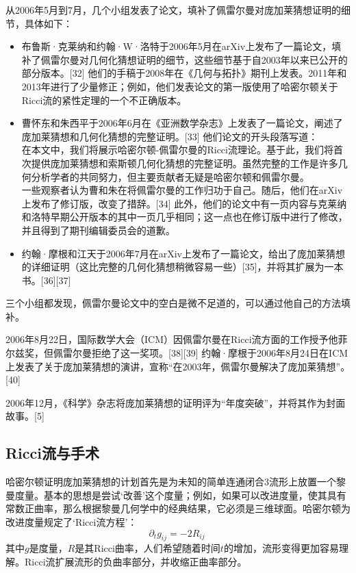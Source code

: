 从2006年5月到7月，几个小组发表了论文，填补了佩雷尔曼对庞加莱猜想证明的细节，具体如下：
\begin{itemize}
\item 布鲁斯·克莱纳和约翰·W·洛特于2006年5月在arXiv上发布了一篇论文，填补了佩雷尔曼对几何化猜想证明的细节，这些细节基于自2003年以来已公开的部分版本。[32] 他们的手稿于2008年在《几何与拓扑》期刊上发表。2011年和2013年进行了少量修正；例如，他们发表论文的第一版使用了哈密尔顿关于Ricci流的紧性定理的一个不正确版本。
\item 曹怀东和朱西平于2006年6月在《亚洲数学杂志》上发表了一篇论文，阐述了庞加莱猜想和几何化猜想的完整证明。[33] 他们论文的开头段落写道：\\
在本文中，我们将展示哈密尔顿-佩雷尔曼的Ricci流理论。基于此，我们将首次提供庞加莱猜想和索斯顿几何化猜想的完整证明。虽然完整的工作是许多几何分析学者的共同努力，但主要贡献者无疑是哈密尔顿和佩雷尔曼。\\
一些观察者认为曹和朱在将佩雷尔曼的工作归功于自己。随后，他们在arXiv上发布了修订版，改变了措辞。[34] 此外，他们的论文中有一页内容与克莱纳和洛特早期公开版本的其中一页几乎相同；这一点也在修订版中进行了修改，并且得到了期刊编辑委员会的道歉。\\
\item 约翰·摩根和江天于2006年7月在arXiv上发布了一篇论文，给出了庞加莱猜想的详细证明（这比完整的几何化猜想稍微容易一些）[35]，并将其扩展为一本书。[36][37]
\end{itemize}
三个小组都发现，佩雷尔曼论文中的空白是微不足道的，可以通过他自己的方法填补。

2006年8月22日，国际数学大会（ICM）因佩雷尔曼在Ricci流方面的工作授予他菲尔兹奖，但佩雷尔曼拒绝了这一奖项。[38][39] 约翰·摩根于2006年8月24日在ICM上发表了关于庞加莱猜想的演讲，宣称“在2003年，佩雷尔曼解决了庞加莱猜想”。[40]

2006年12月，《科学》杂志将庞加莱猜想的证明评为“年度突破”，并将其作为封面故事。[5]
\subsection{Ricci流与手术}  
哈密尔顿证明庞加莱猜想的计划首先是为未知的简单连通闭合3流形上放置一个黎曼度量。基本的思想是尝试‘改善’这个度量；例如，如果可以改进度量，使其具有常数正曲率，那么根据黎曼几何学中的经典结果，它必须是三维球面。哈密尔顿为改进度量规定了‘Ricci流方程’：
\[
\partial_t g_{ij} = -2 R_{ij}~
\]
其中\(g\)是度量，\(R\)是其Ricci曲率，人们希望随着时间\(t\)的增加，流形变得更加容易理解。Ricci流扩展流形的负曲率部分，并收缩正曲率部分。

